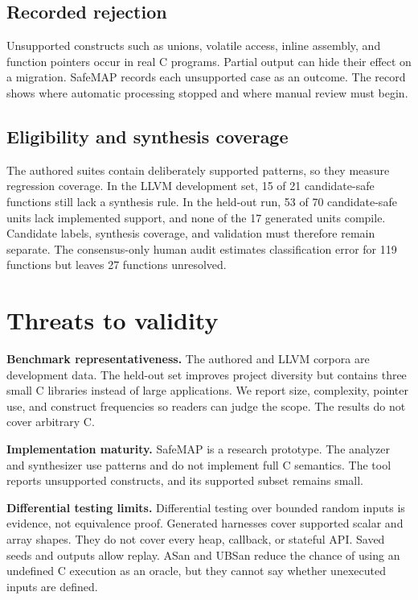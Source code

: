 \documentclass[conference]{IEEEtran}
\newcommand{\tool}{SafeMAP\xspace}
\begin{document}
\subsection{Recorded rejection}

Unsupported constructs such as unions, volatile access, inline assembly, and
function pointers occur in real C programs. Partial output can hide their
effect on a migration. \tool records each unsupported case as an outcome. The
record shows where automatic processing stopped and where manual review must
begin.

\subsection{Eligibility and synthesis coverage}

The authored suites contain deliberately supported patterns, so they measure
regression coverage. In the LLVM development set, 15 of 21 candidate-safe
functions still lack a synthesis rule. In the held-out run, 53 of 70
candidate-safe units lack implemented support, and none of the 17 generated
units compile. Candidate labels, synthesis coverage, and validation must
therefore remain separate. The consensus-only human audit estimates
classification error for 119 functions but leaves 27 functions unresolved.

\section{Threats to validity}

\textbf{Benchmark representativeness.} The authored and LLVM corpora are
development data. The held-out set improves project diversity but contains
three small C libraries instead of large applications. We report size,
complexity, pointer use, and construct frequencies so readers can judge the
scope. The results do not cover arbitrary C.

\textbf{Implementation maturity.} \tool is a research prototype. The analyzer
and synthesizer use patterns and do not implement full C semantics. The tool
reports unsupported constructs, and its supported subset remains small.

\textbf{Differential testing limits.} Differential testing over bounded random
inputs is evidence, not equivalence proof. Generated harnesses cover supported
scalar and array shapes. They do not cover every heap, callback, or stateful
API. Saved seeds and outputs allow replay. ASan and UBSan reduce the chance of
using an undefined C execution as an oracle, but they cannot say whether
unexecuted inputs are defined.
\end{document}
